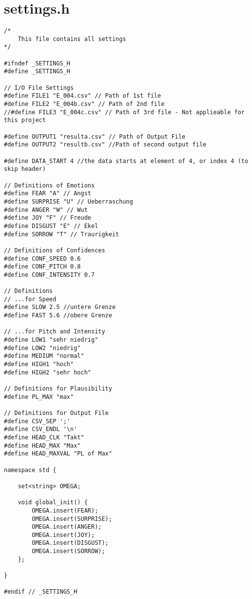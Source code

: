 \section*{settings.h}
\begin{lstlisting}[caption=Code settings.h]
/*
	This file contains all settings
*/

#ifndef _SETTINGS_H
#define _SETTINGS_H

// I/O File Settings
#define FILE1 "E_004.csv" // Path of 1st file
#define FILE2 "E_004b.csv" // Path of 2nd file
//#define FILE3 "E_004c.csv" // Path of 3rd file - Not applieable for this project

#define OUTPUT1 "resulta.csv" // Path of Output File
#define OUTPUT2 "resultb.csv" //Path of second output file

#define DATA_START 4 //the data starts at element of 4, or index 4 (to skip header)

// Definitions of Emotions
#define FEAR "A" // Angst
#define SURPRISE "U" // Ueberraschung
#define ANGER "W" // Wut
#define JOY "F" // Freude 
#define DISGUST "E" // Ekel
#define SORROW "T" // Traurigkeit

// Definitions of Confidences
#define CONF_SPEED 0.6
#define CONF_PITCH 0.8
#define CONF_INTENSITY 0.7

// Definitions 
// ...for Speed 
#define SLOW 2.5 //untere Grenze
#define FAST 5.6 //obere Grenze

// ...for Pitch and Intensity
#define LOW1 "sehr niedrig"
#define LOW2 "niedrig"
#define MEDIUM "normal"
#define HIGH1 "hoch"
#define HIGH2 "sehr hoch"

// Definitions for Plausibility
#define PL_MAX "max"

// Definitions for Output File
#define CSV_SEP ';'
#define CSV_ENDL '\n'
#define HEAD_CLK "Takt"
#define HEAD_MAX "Max"
#define HEAD_MAXVAL "PL of Max"

namespace std {

	set<string> OMEGA;

	void global_init() {
		OMEGA.insert(FEAR);
		OMEGA.insert(SURPRISE);
		OMEGA.insert(ANGER);
		OMEGA.insert(JOY);
		OMEGA.insert(DISGUST);
		OMEGA.insert(SORROW);
	};

}

#endif // _SETTINGS_H
\end{lstlisting}